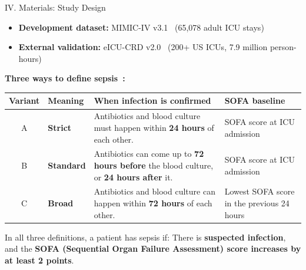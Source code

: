 \begin{frame}{IV. Materials: Study Design}
\begin{itemize}
  \item \textbf{Development dataset:} MIMIC-IV
        v3.1~\cite{johnson2023mimiciv} (65,078 adult ICU stays)
  \item \textbf{External validation:} eICU-CRD v2.0~\cite{pollard2018eicu}
        (200+ US ICUs, 7.9 million person-hours)
\end{itemize}

\vspace{4pt}
\textbf{Three ways to define sepsis~\cite{singer2016sepsis3}:}
\vspace{1pt}
\begin{center}\renewcommand{\arraystretch}{1.1}\scriptsize
\begin{tabular}{clp{5.6cm}p{3.6cm}}
\toprule
\textbf{Variant} & \textbf{Meaning} & \textbf{When infection is confirmed}
  & \textbf{SOFA baseline} \\
\midrule
A & \textbf{Strict}
  & Antibiotics and blood culture must happen within \textbf{24 hours} of
    each other.
  & SOFA score at ICU admission \\[3pt]
B & \textbf{Standard}
  & Antibiotics can come up to \textbf{72 hours before} the blood culture,
    or \textbf{24 hours after} it.
  & SOFA score at ICU admission \\[3pt]
C & \textbf{Broad}
  & Antibiotics and blood culture can happen within \textbf{72 hours} of
    each other.
  & Lowest SOFA score in the previous 24 hours \\
\bottomrule
\end{tabular}
\end{center}

\vspace{4pt}
\begin{alertblock}{In all three definitions, a patient has sepsis if:}
  \small There is \textbf{suspected infection}, and the \textbf{SOFA (Sequential
  Organ Failure Assessment) score increases by at least 2 points}.
\end{alertblock}
\end{frame}
